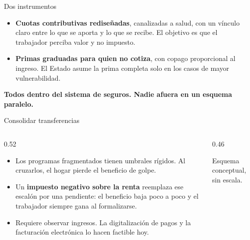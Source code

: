 \documentclass[aspectratio=169,11pt]{beamer}
\newcommand{\clave}[1]{\textcolor{acento}{\textbf{#1}}}
\newcommand{\destacar}[1]{%
  \vspace{0.5em}%
  \begin{center}%
    \colorbox{banda}{\parbox{0.92\textwidth}{\centering\vspace{0.3em}\textbf{#1}\vspace{0.3em}}}%
  \end{center}%
}
\begin{document}
\begin{frame}{Dos instrumentos}
  \begin{itemize}
    \item \clave{Cuotas contributivas rediseñadas}, canalizadas a salud, con un vínculo claro entre lo que se aporta y lo que se recibe. El objetivo es que el trabajador perciba valor y no impuesto.
    \item \clave{Primas graduadas para quien no cotiza}, con copago proporcional al ingreso. El Estado asume la prima completa solo en los casos de mayor vulnerabilidad.
  \end{itemize}
  \destacar{Todos dentro del sistema de seguros. Nadie afuera en un esquema paralelo.}
\end{frame}

\begin{frame}{Consolidar transferencias}
  \begin{columns}[T]
    \begin{column}{0.52\textwidth}
      \small
      \begin{itemize}
        \item Los programas fragmentados tienen umbrales rígidos. Al cruzarlos, el hogar pierde el beneficio de golpe.
        \item Un \clave{impuesto negativo sobre la renta} reemplaza ese escalón por una pendiente: el beneficio baja poco a poco y el trabajador siempre gana al formalizarse.
        \item Requiere observar ingresos. La digitalización de pagos y la facturación electrónica lo hacen factible hoy.
      \end{itemize}
    \end{column}
    \begin{column}{0.46\textwidth}
      \vspace{0.4em}
      \begin{center}
      \end{center}
      \vspace{0.2em}
      {\tiny\color{grisfino}Esquema conceptual, sin escala.}
    \end{column}
  \end{columns}
\end{frame}
\end{document}
